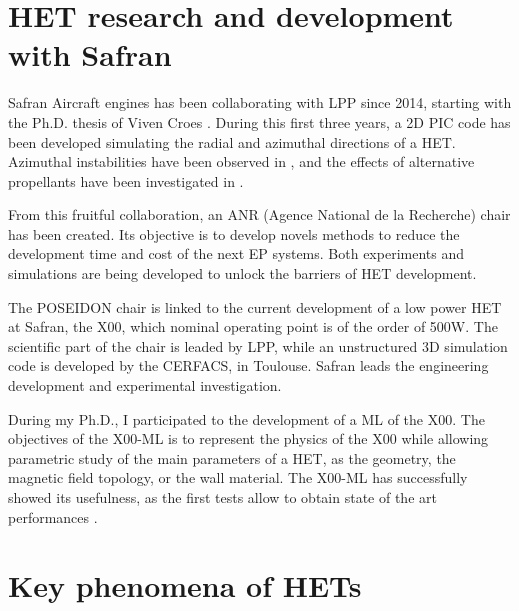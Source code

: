 

\section*{\ac{HET} research and development with Safran}
\label{sec-poseidon}



Safran Aircraft engines has been collaborating with \ac{LPP} since 2014, starting with the Ph.D. thesis of Viven Croes \citep{croes2017}.
During this first three years, a \ac{2D} \ac{PIC} code has been developed simulating the radial and azimuthal directions of a \ac{HET}.
Azimuthal instabilities have been observed in \citet{croes2017a}, and the effects of alternative propellants have been investigated in \citet{croes2018}.

From this fruitful collaboration, an ANR (Agence National de la Recherche) chair has been created.
Its objective is to develop novels methods to reduce the development time and cost of the next \ac{EP} systems.
Both experiments and simulations are being developed to unlock the barriers of \ac{HET} development.

The POSEIDON chair is linked to the current development of a  low power \ac{HET} at Safran, the \PPS X00, which nominal operating point is of the order of 500W.
The scientific part of the chair is leaded by \ac{LPP}, while an unstructured \ac{3D} simulation code is developed by the CERFACS, in Toulouse.
Safran leads the engineering development and experimental investigation.

During my Ph.D., I participated to the development of a \ac{ML} of the \PPS X00.
The objectives of the \PPS X00-\ac{ML}  is to represent the physics of the \PPS X00 while allowing parametric study of the main parameters of a \ac{HET}, as the geometry, the magnetic field topology, or the wall material.
The \PPS X00-\ac{ML} has successfully showed its usefulness, as the first tests allow to obtain state of the art performances \citep{vaudolon2018}.


\section*{Key phenomena of \ac{HET}s}

